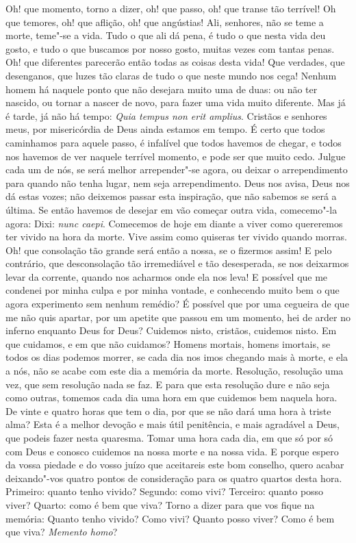 Oh! que momento, torno a dizer, oh! que passo, oh! que transe
tão terrível! Oh que temores, oh! que aflição, oh! que angústias! Ali,
senhores, não se teme a morte, teme"-se a vida. Tudo o que ali dá pena, é
tudo o que nesta vida deu gosto, e tudo o que buscamos por nosso gosto,
muitas vezes com tantas penas. Oh! que diferentes parecerão então todas
as coisas desta vida! Que verdades, que desenganos, que luzes tão claras
de tudo o que neste mundo nos cega! Nenhum homem há naquele ponto que
não desejara muito uma de duas: ou não ter nascido, ou tornar a nascer
de novo, para fazer uma vida muito diferente. Mas já é tarde, já não há
tempo: \emph{Quia tempus non erit amplius}. Cristãos e %
senhores meus, por misericórdia de Deus ainda estamos em tempo. É certo
que todos caminhamos para aquele passo, é infalível que todos havemos de
chegar, e todos nos havemos de ver naquele terrível momento, e pode ser
que muito cedo. Julgue cada um de nós, se será melhor arrepender"-se
agora, ou deixar o arrependimento para quando não tenha lugar, nem seja
arrependimento. Deus nos avisa, Deus nos dá estas vozes; não deixemos
passar esta inspiração, que não sabemos se será a última. Se então
havemos de desejar em vão começar outra vida, comecemo"-la agora: Dixi:
\emph{nunc caepi}. Comecemos de hoje em diante a viver como quereremos
ter vivido na hora da morte. Vive assim como quiseras ter vivido quando
morras. Oh! que consolação tão grande será então a nossa, se o fizermos
assim! E pelo contrário, que desconsolação tão irremediável e tão
desesperada, se nos deixarmos levar da corrente, quando nos acharmos
onde ela nos leva! E possível que me condenei por minha culpa e por
minha vontade, e conhecendo muito bem o que agora experimento sem nenhum
remédio? É possível que por uma cegueira de que me não quis apartar, por
um apetite que passou em um momento, hei de arder no inferno enquanto
Deus for Deus? Cuidemos nisto, cristãos, cuidemos nisto. Em que
cuidamos, e em que não cuidamos? Homens mortais, homens imortais, se
todos os dias podemos morrer, se cada dia nos imos chegando mais à
morte, e ela a nós, não se acabe com este dia a memória da morte.
Resolução, resolução uma vez, que sem resolução nada se faz. E para que
esta resolução dure e não seja como outras, tomemos cada dia uma hora em
que cuidemos bem naquela hora. De vinte e quatro horas que tem o dia,
por que se não dará uma hora à triste alma? Esta é a melhor devoção e
mais útil penitência, e mais agradável a
Deus, que podeis fazer nesta quaresma. Tomar uma hora cada dia, em que
só por só com Deus e conosco cuidemos na nossa morte e na nossa vida. E
porque espero da vossa piedade e do vosso juízo que aceitareis este bom
conselho, quero acabar deixando"-vos quatro pontos de consideração para
os quatro quartos desta hora. Primeiro: quanto tenho vivido? Segundo:
como vivi? Terceiro: quanto posso viver? Quarto: como é bem que viva?
Torno a dizer para que vos fique na memória: Quanto tenho vivido? Como
vivi? Quanto posso viver? Como é bem que viva? \emph{Memento homo}?

